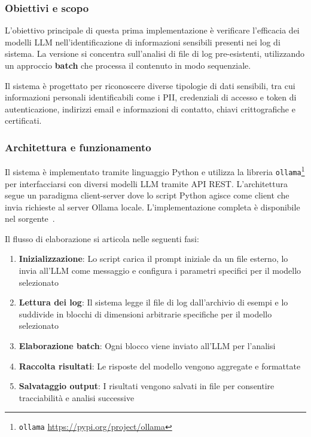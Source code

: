 \documentclass[12pt,twoside]{report}
\begin{document}
\subsubsection{Obiettivi e scopo}
\label{subsubsec:ver1_obiettivi}

L'obiettivo principale di questa prima implementazione è verificare l'efficacia dei modelli LLM nell'identificazione di informazioni sensibili presenti nei log di sistema. La versione si concentra sull'analisi di file di log pre-esistenti, utilizzando un approccio \textbf{batch} che processa il contenuto in modo sequenziale.

Il sistema è progettato per riconoscere diverse tipologie di dati sensibili, tra cui informazioni personali identificabili come i PII, credenziali di accesso e token di autenticazione, indirizzi email e informazioni di contatto, chiavi crittografiche e certificati.

\subsubsection{Architettura e funzionamento}
\label{subsubsec:ver1_architettura}

Il sistema è implementato tramite linguaggio Python e utilizza la libreria \texttt{ollama}\footnote{\texttt{ollama} \url{https://pypi.org/project/ollama}} per interfacciarsi con diversi modelli LLM tramite API REST. L'architettura segue un paradigma client-server dove lo script Python agisce come client che invia richieste al server Ollama locale. L'implementazione completa è disponibile nel sorgente~.

Il flusso di elaborazione si articola nelle seguenti fasi:

\begin{enumerate}
    \item \textbf{Inizializzazione}: Lo script carica il prompt iniziale da un file esterno, lo invia all'LLM come messaggio e configura i parametri specifici per il modello selezionato
    \item \textbf{Lettura dei log}: Il sistema legge il file di log dall'archivio di esempi e lo suddivide in blocchi di dimensioni arbitrarie specifiche per il modello selezionato
    \item \textbf{Elaborazione batch}: Ogni blocco viene inviato all'LLM per l'analisi
    \item \textbf{Raccolta risultati}: Le risposte del modello vengono aggregate e formattate
    \item \textbf{Salvataggio output}: I risultati vengono salvati in file per consentire tracciabilità e analisi successive
\end{enumerate}
\end{document}
